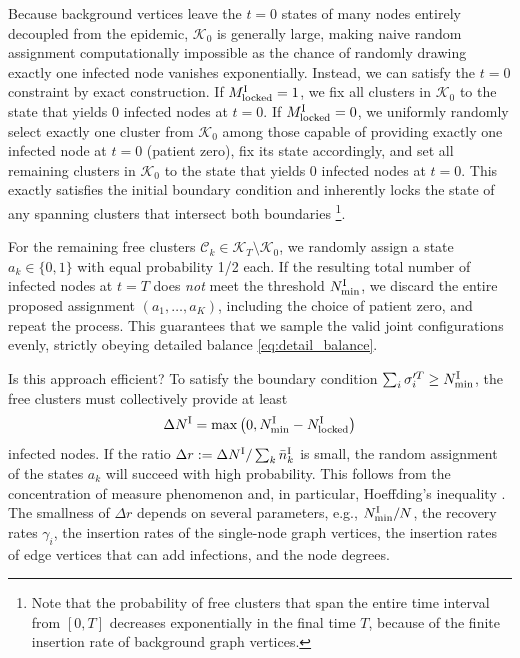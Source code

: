 \documentclass[english,10pt,aps,pra,twocolumn,superscriptaddress,floatfix,fleqn]{revtex4-2}
\newcommand{\mc}[1]{\mathcal{#1}}
\newcommand{\C} {\mc{C}}
\newcommand{\K} {\mc{K}}
\newcommand{\tI}{\textnormal{I}}
\newcommand{\lock}{\textnormal{locked}}
\begin{document}
Because background vertices leave the $t=0$ states of many nodes entirely decoupled from the epidemic, $\K_0$ is generally large, making naive random assignment computationally impossible as the chance of randomly drawing exactly one infected node vanishes exponentially. Instead, we can satisfy the $t=0$ constraint by exact construction. If $M^\tI_\lock = 1$, we fix all clusters in $\K_0$ to the state that yields 0 infected nodes at $t=0$. If $M^\tI_\lock = 0$, we uniformly randomly select exactly one cluster from $\K_0$ among those capable of providing exactly one infected node at $t=0$ (patient zero), fix its state accordingly, and set all remaining clusters in $\K_0$ to the state that yields 0 infected nodes at $t=0$. This exactly satisfies the initial boundary condition and inherently locks the state of any spanning clusters that intersect both boundaries \footnote{Note that the probability of free clusters that span the entire time interval from $[0,T]$ decreases exponentially in the final time $T$, because of the finite insertion rate of background graph vertices.}.

For the remaining free clusters $\C_k\in \K_T \setminus \K_0$, we randomly assign a state $a_k \in \{0,1\}$ with equal probability 1/2 each.
If the resulting total number of infected nodes at $t=T$ does \emph{not} meet the threshold $N^\tI_{\min}$, we discard the entire proposed assignment $(a_1,\dotsc,a_K)$, including the choice of patient zero, and repeat the process. This guarantees that we sample the valid joint configurations evenly, strictly obeying detailed balance \eqref{eq:detail_balance}.

Is this approach efficient? To satisfy the boundary condition $\sum_i \sigma_i^{\prime T} \geq N^\tI_{\min}$, the free clusters must collectively provide at least
\begin{equation}
	\Delta N^\tI = \max\left(0, N^\tI_{\min} - N^\tI_\lock\right)
\end{equation}
infected nodes. If the ratio $\Delta r:=\Delta N^\tI/ \sum_k \bar{n}^\tI_k$ is small, the random assignment of the states $a_k$ will succeed with high probability. This follows from the concentration of measure phenomenon and, in particular, Hoeffding's inequality \cite{Hoeffding1963-58,Boucheron2013}. The smallness of $\Delta r$ depends on several parameters, e.g., $N^\tI_{\min}/N$, the recovery rates $\gamma_i$, the insertion rates of the single-node graph vertices, the insertion rates of edge vertices that can add infections, and the node degrees.
\end{document}
